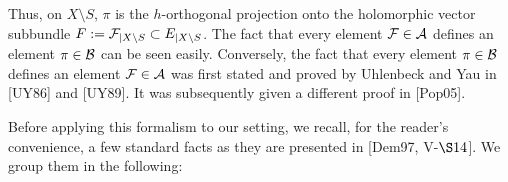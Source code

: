 \documentclass[12pt]{article}
\begin{document}
\vspace{2ex}

Thus, on $X\setminus S$, $\pi$ is the $h$-orthogonal projection onto the holomorphic vector subbundle $F:={\cal F}_{|X\setminus S}\subset E_{|X\setminus S}$. The fact that every element ${\cal F}\in{\cal A}$ defines an element $\pi\in{\cal B}$ can be seen easily. Conversely, the fact that every element $\pi\in{\cal B}$ defines an element ${\cal F}\in{\cal A}$ was first stated and proved by Uhlenbeck and Yau in [UY86] and [UY89]. It was subsequently given a different proof in [Pop05].

\vspace{2ex}

Before applying this formalism to our setting, we recall, for the reader's convenience, a few standard facts as they are presented in [Dem97, V-$\S14$]. We group them in the following:
\end{document}
